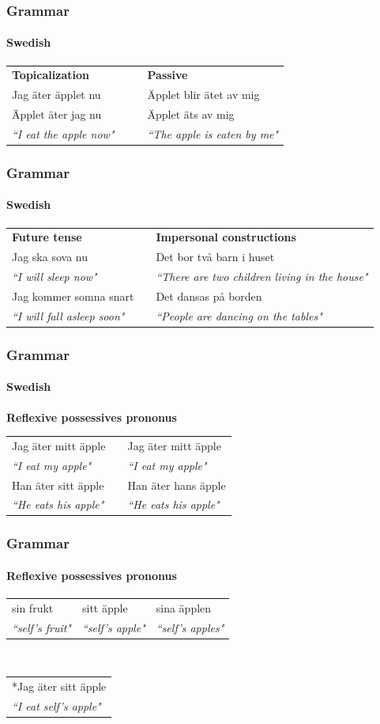 \documentclass[10pt]{beamer}
\begin{document}
\begin{frame}
\frametitle{Grammar}
\framesubtitle{Swedish} 
\begin{tabular}{llll}
\textbf{Topicalization}& && \textbf{Passive}\\
Jag äter äpplet nu && &Äpplet blir ätet av mig \\
Äpplet äter jag nu &&& Äpplet äts av mig \\
\emph{``I eat the apple now"}& &&\emph{``The apple is eaten by me"}\\
\end{tabular}
\end{frame}

\begin{frame}
\frametitle{Grammar}
\framesubtitle{Swedish} 
\begin{tabular}{lll}
 \textbf{Future tense}  &&\textbf{Impersonal constructions} \\
Jag ska sova nu & &Det bor två barn i huset \\
\emph{``I will sleep now"} && \emph{``There are two children living in the house"} \\
Jag kommer somna snart &&Det dansas på borden  \\
\emph{``I will fall asleep soon"} &&\emph{``People are dancing on the tables"}  \\
\end{tabular}
\end{frame}

\begin{frame}
\frametitle{Grammar}
\framesubtitle{Swedish} 
\textbf{Reflexive possessives prononus}\\
\begin{tabular}{lll}
Jag äter mitt äpple && Jag äter mitt äpple \\
\emph{``I eat my apple"} && \emph{``I eat my apple"} \\
Han äter sitt äpple && Han äter hans äpple \\
\emph{``He eats his apple"} && \emph{``He eats his apple"} \\
\end{tabular}
\end{frame}


\begin{frame}
\frametitle{Grammar}
\framesubtitle{Reflexive possessives prononus}
\begin{tabular}{lll}
sin frukt & sitt äpple &sina äpplen \\
\emph{``{\sc self's} fruit"} & \emph{``{\sc self's} apple"} & \emph{``{\sc self's} apples"} \\
\end{tabular}
\\
\vspace{5mm}
\begin{tabular}{l}
\pause
*Jag äter sitt äpple \\
\emph{``I eat {\sc self's} apple"} \\
\end{tabular}
\end{frame}
\end{document}
